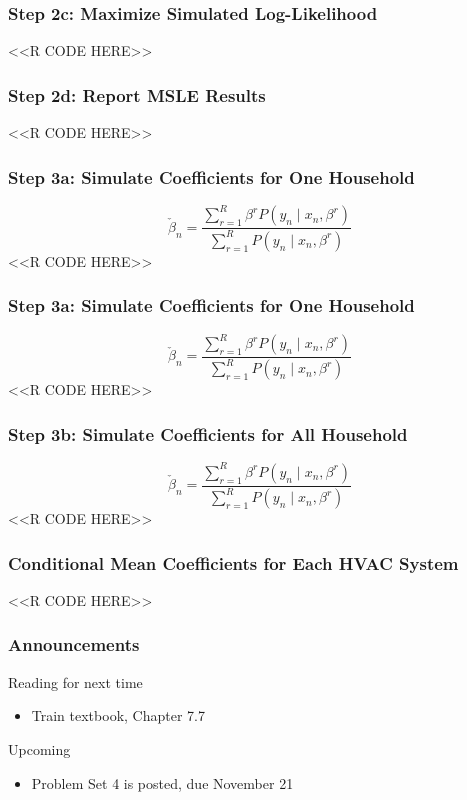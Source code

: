\documentclass{beamer}
\begin{document}
\begin{frame}[fragile]\frametitle{Step 2c: Maximize Simulated Log-Likelihood}
    <<R CODE HERE>>
\end{frame}

\begin{frame}[fragile]\frametitle{Step 2d: Report MSLE Results}
    <<R CODE HERE>>
\end{frame}

\begin{frame}[fragile]\frametitle{Step 3a: Simulate Coefficients for One Household}
    $$\check{\beta}_n = \frac{\sum_{r = 1}^R \beta^r P(y_n \mid x_n, \beta^r)}{\sum_{r = 1}^R P(y_n \mid x_n, \beta^r)}$$
    <<R CODE HERE>>
\end{frame}

\begin{frame}[fragile]\frametitle{Step 3a: Simulate Coefficients for One Household}
    $$\check{\beta}_n = \frac{\sum_{r = 1}^R \beta^r P(y_n \mid x_n, \beta^r)}{\sum_{r = 1}^R P(y_n \mid x_n, \beta^r)}$$
    <<R CODE HERE>>
\end{frame}

\begin{frame}[fragile]\frametitle{Step 3b: Simulate Coefficients for All Household}
    $$\check{\beta}_n = \frac{\sum_{r = 1}^R \beta^r P(y_n \mid x_n, \beta^r)}{\sum_{r = 1}^R P(y_n \mid x_n, \beta^r)}$$
    <<R CODE HERE>>
\end{frame}

\begin{frame}[fragile]\frametitle{Conditional Mean Coefficients for Each HVAC System}
    <<R CODE HERE>>
\end{frame}

\begin{frame}\frametitle{Announcements}
    Reading for next time
    \begin{itemize}
        \item Train textbook, Chapter 7.7
    \end{itemize}
    \vspace{3ex}
    Upcoming
    \begin{itemize}
        \item Problem Set 4 is posted, due November 21
    \end{itemize}
\end{frame}
\end{document}
